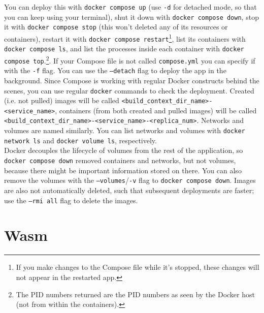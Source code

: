 \documentclass[table, xcdraw]{article}%
\begin{document}
You can deploy this with \texttt{docker compose up} (use \texttt{-d} for detached mode, so that you can keep using your terminal), shut it down with \texttt{docker compose down}, stop it with \texttt{docker compose stop} (this won't deleted any of its resources or containers), restart it with \texttt{docker compose restart}\footnote{If you make changes to the Compose file while it’s stopped, these changes will not appear in the restarted app.}, list its containers with \texttt{docker compose ls}, and list the processes inside each container with \texttt{docker compose top}.\footnote{The PID numbers returned are the PID numbers as seen by the Docker host (not from within the containers).}. If your Compose file is not called \texttt{compose.yml} you can specify if with the \texttt{-f} flag. You can use the \texttt{--detach} flag to deploy the app in the background. Since Compose is working with regular Docker constructs behind the scenes, you can use regular \texttt{docker} commands to check the deployment. Created (i.e. not pulled) images will be called \texttt{<build_context_dir_name>-<service_name>}, containers (from both created and pulled images) will be called \texttt{<build_context_dir_name>-<service_name>-<replica_num>}. Networks and volumes are named similarly. You can list networks and volumes with \texttt{docker network ls} and \texttt{docker volume ls}, respectively.\\
Docker decouples the lifecycle of volumes from the rest of the application, so \texttt{docker compose down} removed containers and networks, but not volumes, because there might be important information stored on there. You can also remove the volumes with the \texttt{--volumes}/\texttt{-v} flag to \texttt{docker compose down}. Images are also not automatically deleted, such that subsequent deployments are faster; use the \texttt{--rmi all} flag to delete the images.

\section{Wasm}
\end{document}
